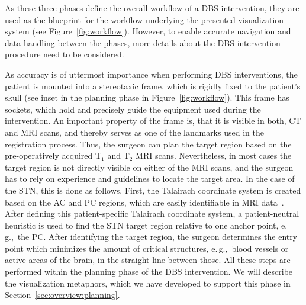 \documentclass[journal]{vgtc}                %
\begin{document}
As these three phases define the overall workflow of a DBS intervention, they are used as the blueprint for the workflow underlying the presented visualization system (see Figure~\ref{fig:workflow}). However, to enable accurate navigation and data handling between the phases, more details about the DBS intervention procedure need to be considered.

As accuracy is of uttermost importance when performing DBS interventions, the patient is mounted into a stereotaxic frame, which is rigidly fixed to the patient's skull (see inset in the planning phase in Figure~\ref{fig:workflow}). This frame has sockets, which hold and precisely guide the equipment used during the intervention. An important property of the frame is, that it is visible in both, CT and MRI scans, and thereby serves as one of the landmarks used in the registration process. Thus, the surgeon can plan the target region based on the pre-operatively acquired T$_1$ and T$_2$ MRI scans. Nevertheless, in most cases the target region is not directly visible on either of the MRI scans, and the surgeon has to rely on experience and guidelines to locate the target area. In the case of the STN, this is done as follows. First, the Talairach coordinate system is created based on the AC and PC regions, which are easily identifiable in MRI data~\cite{Talairach1993}. After defining this patient-specific Talairach coordinate system, a patient-neutral heuristic is used to find the STN target region relative to one anchor point, e.\,g.,~the PC. After identifying the target region, the surgeon determines the entry point which minimizes the amount of critical structures, e.\,g.,~blood vessels or active areas of the brain, in the straight line between those. All these steps are performed within the planning phase of the DBS intervention. We will describe the visualization metaphors, which we have developed to support this phase in Section~\ref{sec:overview:planning}.
\end{document}
